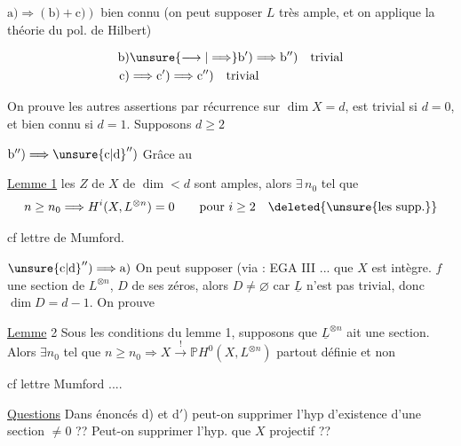 $\mathrm{a)}\Longrightarrow(\mathrm{b)}+\mathrm{c)})$ bien connu (on peut supposer $L$ très ample, et on applique la théorie du pol. de Hilbert)

\[
\begin{aligned}
\mathrm{b)}&\unsure{\longrightarrow|\Longrightarrow}\mathrm{b}')\Longrightarrow\mathrm{b}'')\quad\text{trivial}\\
\mathrm{c)}&\Longrightarrow\mathrm{c}')\Longrightarrow\mathrm{c}'')\quad\text{trivial}
\end{aligned}
\]

On prouve les autres assertions par récurrence sur  $\dim X=d$,  est trivial si $d=0$, et bien connu  si $d=1$. Supposons $d\geq2$

$\mathrm{b}'')\Longrightarrow\unsure{\mathrm{c}|\mathrm{d}}'')$ Grâce au

\uline{Lemme 1}  les   $Z$ de $X$ de $\dim<d$ sont amples, alors $\exists\,n_0$ tel que
\[
 n\geq n_0\Longrightarrow H^i(X,L^{\otimes n})=0\qquad\text{pour }i\geq2\quad\deleted{\text{\unsure{les supp.}}}
\]

cf lettre de Mumford.



$\unsure{\mathrm{c}|\mathrm{d}}'')\Longrightarrow\mathrm{a)}$ On peut supposer (via : EGA III ... que $X$ est intègre.    $f$ une section de $L^{\otimes n}$,  $D$  de ses zéros, alors $D\ne\varnothing$ car $\underline L$ n'est pas trivial, donc $\dim D=d-1$. On prouve

\uline{Lemme} 2 Sous les conditions du lemme 1, supposons que  $\underline L^{\otimes n}$ ait une section. Alors \deleted{$\unsure{\exists}$} $\exists n_0$ tel que $n\geq n_0\Longrightarrow X\overset{!}{\longrightarrow}\mathbb P H^0(X,L^{\otimes n})$ partout définie et non 


cf lettre Mumford ....

\uline{Questions} Dans  énoncés d) et d$'$) peut-on supprimer l'hyp d'existence d'une section $\ne0$ ??   Peut-on supprimer l'hyp. que $X$ projectif ??

